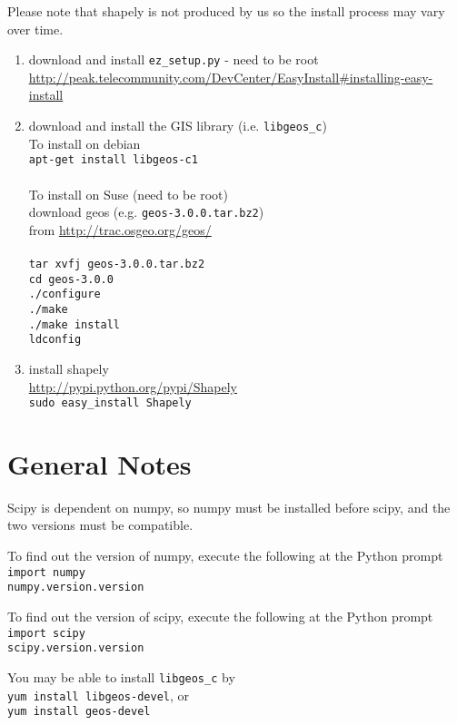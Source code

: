 \documentclass[a4paper, 12pt]{article}
\begin{document}
Please note that shapely is not produced by us so the install
process may vary over time.
\begin{enumerate}

\item download and install \texttt{ez\_setup.py} - need to be root \\
\url{http://peak.telecommunity.com/DevCenter/EasyInstall#installing-easy-install}

\item download and install the GIS library (i.e.
\texttt{libgeos\_c}) \\
To install on debian \\
\texttt{apt-get install libgeos-c1}\\
 \\
To install on Suse (need to be root) \\
download geos (e.g. \texttt{geos-3.0.0.tar.bz2}) \\
from \url{http://trac.osgeo.org/geos/} \\
 \\
\texttt{tar xvfj geos-3.0.0.tar.bz2} \\
\texttt{cd geos-3.0.0} \\
\texttt{./configure} \\
\texttt{./make} \\
\texttt{./make install} \\
\texttt{ldconfig}

\item install shapely \\
\url{http://pypi.python.org/pypi/Shapely} \\
\texttt{sudo easy\_install Shapely}

\end{enumerate}

%
%
\section{General Notes}

Scipy is dependent on numpy, so numpy must be installed before
scipy, and the two versions must be compatible.

To find out the version of numpy, execute the following at the Python prompt \\
\texttt{import numpy} \\
\texttt{numpy.version.version}

To find out the version of scipy, execute the following at the Python prompt \\
\texttt{import scipy} \\
\texttt{scipy.version.version}

You may be able to install \texttt{libgeos\_c} by \\
\texttt{yum install libgeos-devel}, or \\
\texttt{yum install geos-devel}
\end{document}
